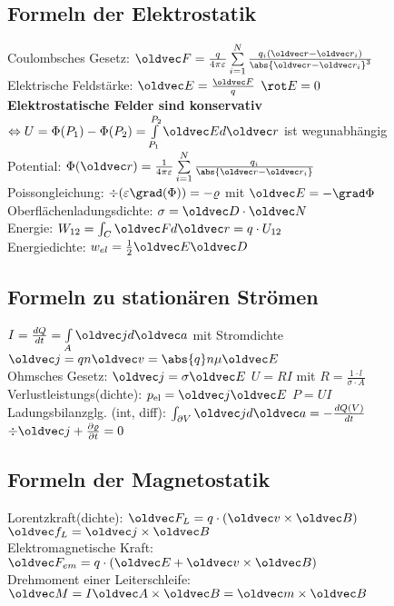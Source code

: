 \documentclass[6pt,a4paper]{scrartcl}
\let\vec\oldvec
\begin{document}
\begin{multicols}{4}
\subsection{Formeln der Elektrostatik}
Coulombsches Gesetz: $\vec F = \frac{q}{4 \pi \varepsilon} \sum \limits_{i = 1}^N\frac{q_i (\vec r - \vec r_i )}{\abs{\vec r - \vec r_i}^3}$ \\
Elektrische Feldstärke: $\vec E = \frac{\vec F}{q} $ \quad $\rot E = 0$ \\
\textbf{Elektrostatische Felder sind konservativ} $\Leftrightarrow U = \Phi(P_1) - \Phi(P_2) = \int \limits_{P_1}^{P_2} \vec E d \vec r$ ist wegunabhängig \\
Potential: $\Phi (\vec r) = \frac{1}{4 \pi \varepsilon} \sum \limits_{i =1}^{N} \frac{q_i}{\abs{\vec r - \vec r_i}}$ \\
Poissongleichung: $\div(\varepsilon \grad(\Phi)) = - \varrho$ mit $\vec E = -\grad \Phi$ \\
Oberflächenladungsdichte: $\sigma = \vec D \cdot \vec N$ \\
Energie: $W_{12} = \int_C \vec F d \vec r = q \cdot U_{12}$ \\
Energiedichte: $w_{el} = \frac{1}{2} \vec E \vec D$ \\

\subsection{Formeln zu stationären Strömen}
$I = \frac{d Q}{d t} = \int \limits_A \vec j d \vec a$ mit Stromdichte $\vec j = qn\vec v = \abs{q}n\mu \vec E$ \\
Ohmsches Gesetz: $\vec j = \sigma\vec E$ \quad $U = R I$ mit $R = \frac{1 \cdot l}{\sigma\cdot A}$ \\
Verlustleistungs(dichte): $p_{\text{el}} = \vec j \vec E$ \quad $P = UI$ \\
Ladungsbilanzglg. (int, diff): $\int_{\partial V} \vec j d \vec a  = - \frac{d Q(V)}{dt}$ \quad $\div \vec j + \frac{\partial \varrho}{\partial t} = 0$

\subsection{Formeln der Magnetostatik}
Lorentzkraft(dichte): $\vec F_L = q \cdot (\vec v \times \vec B)$ \quad $\vec f_L = \vec j \times \vec B$\\
Elektromagnetische Kraft: $\vec F_{em} = q\cdot(\vec E + \vec v \times \vec B)$\\
Drehmoment einer Leiterschleife: $\vec M = I\vec A \times \vec B = \vec m \times \vec B$


\end{multicols}
\end{document}
